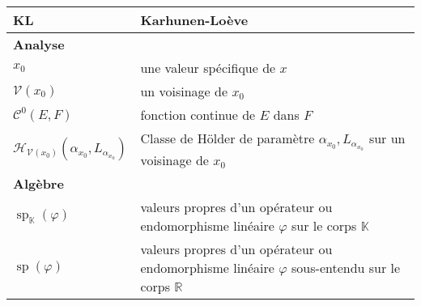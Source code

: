 \begin{table}[H]
\begin{tabularx}{\textwidth}{lX}
	KL                                                               & Karhunen-Loève                                                                                                                                                                                             \\
	\midrule
	\textbf{Analyse}                                                 &                                                                                                                                                                                                            \\
	\midrule
	$x_0$                                                            & une valeur spécifique de $x$                                                                                                                                                                               \\
	$\mathcal{V}(x_0)$                                               & un voisinage de $x_0$                                                                                                                                                                                      \\
	$\mathcal C^0(E, F)$                                             & fonction continue de $E$ dans $F$                                                                                                                                                                          \\
	$\mathcal{H}_{\mathcal{V}(x_0)}(\alpha_{x_0}, L_{\alpha_{x_0}})$ & Classe de Hölder de paramètre $\alpha_{x_0}, L_{\alpha_{x_0}}$ sur un voisinage de $x_0$                                                                                                                   \\
	\midrule
	\textbf{Algèbre}                                                 &                                                                                                                                                                                                            \\
	\midrule
	$\operatorname{sp}_{\mathds K}(\varphi)$                         & valeurs propres d'un opérateur ou endomorphisme linéaire $\varphi$ sur le corps $\mathds K$                                                                                                                \\
	$\operatorname{sp}(\varphi)$                                     & valeurs propres d'un opérateur ou endomorphisme linéaire $\varphi$ sous-entendu sur le corps $\mathds R$                                                                                                   \\

\end{tabularx}
\end{table}
